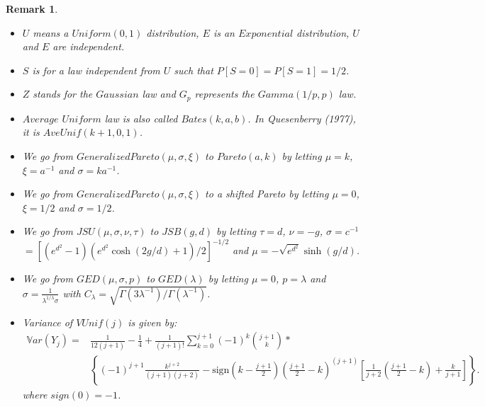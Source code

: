 \documentclass[10pt]{article}
\newtheorem{remark}{Remark}
\newcommand{\VAR}{\mathbb{V}ar}
\begin{document}
\label{remark_laws}
\begin{remark}
\begin{itemize}
  \item $U$ means a $Uniform(0,1)$ distribution, $E$ is an $Exponential$ distribution, $U$ and $E$ are independent.

  \item $S$ is for a law independent from $U$ such that $P[S=0]=P[S=1]=1/2$.

  \item $Z$ stands for the $Gaussian$ law and $G_p$ represents the $Gamma(1/p,p)$ law.

  \item $Average$ $Uniform$ law is also called $Bates(k,a,b)$. In Quesenberry (1977), it is $AveUnif(k+1,0,1)$.

  \item We go from $Generalized Pareto(\mu,\sigma,\xi)$ to $Pareto(a,k)$ by letting $\mu=k$, $\xi=a^{-1}$ and $\sigma=ka^{-1}$.

  \item We go from $Generalized Pareto(\mu,\sigma,\xi)$ to a shifted Pareto by letting $\mu=0$, $\xi=1/2$ and $\sigma=1/2$.

  \item We go from $JSU(\mu,\sigma,\nu,\tau)$ to $JSB(g,d)$ by letting $\tau=d$, $\nu=-g$, $\sigma=c^{-1}$\\ $=\left[(e^{d^2}-1)(e^{d^2}\cosh(2g/d)+1)/2\right]^{-1/2}$ and $\mu=-\sqrt{e^{d^2}}\sinh(g/d)$.

  \item We go from $GED(\mu,\sigma,p)$ to $GED(\lambda)$ by letting $\mu=0$, $p=\lambda$ and $\sigma=\displaystyle{\frac{1}{\lambda^{1/\lambda}\sigma}}$ with $C_{\lambda}=\sqrt{\Gamma(3\lambda^{-1})/\Gamma(\lambda^{-1})}$.

  \item Variance of $VUnif(j)$ is given by:
    \small{\begin{align*}
      \VAR(Y_j) = &\frac{1}{12(j+1)} - \frac{1}{4} + \frac{1}{(j+1)!}\sum_{k=0}^{j+1}(-1)^k{j+1 \choose k}*\\
                 &\left\{(-1)^{j+1} \frac{k^{j+2}}{(j+1)(j+2)} - \textrm{sign}(k-\frac{j+1}{2}) \left(\frac{j+1}{2}-k\right)^{(j+1)} \left[\frac{1}{j+2}\left(\frac{j+1}{2}-k\right)+\frac{k}{j+1}\right]\right\}.
    \end{align*}}
    where $sign(0)=-1$.
\end{itemize}
\end{remark}
\end{document}
